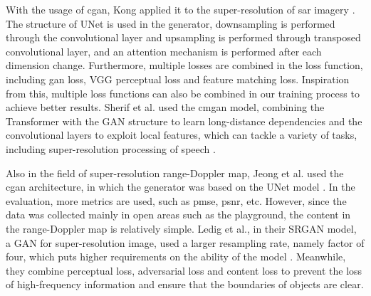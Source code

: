With the usage of \gls{cgan}, Kong applied it to the super-resolution of \gls{sar} imagery \cite{kong_dmsc-gan_2023}. The structure of UNet is used in the generator, downsampling is performed through the convolutional layer and upsampling is performed through transposed convolutional layer, and an attention mechanism is performed after each dimension change. Furthermore, multiple losses are combined in the loss function, including \gls{gan} loss, VGG perceptual loss and feature matching loss. Inspiration from this, multiple loss functions can also be combined in our training process to achieve better results. Sherif et al. used the \gls{cmgan} model, combining the Transformer with the GAN structure to learn long-distance dependencies and the convolutional layers to exploit local features, which can tackle a variety of tasks, including super-resolution processing of speech \cite{abdulatif_cmgan_2024}.

Also in the field of super-resolution range-Doppler map, Jeong et al. used the \gls{cgan} architecture, in which the generator was based on the UNet model \cite{jeong_resource-efficient_2023}. In the evaluation, more metrics are used, such as \gls{pmse}, \gls{psnr}, etc. However, since the data was collected mainly in open areas such as the playground, the content in the range-Doppler map is relatively simple. Ledig et al., in their SRGAN model, a GAN for super-resolution image, used a larger resampling rate, namely factor of four, which puts higher requirements on the ability of the model \cite{ledig_photo-realistic_2017}. Meanwhile, they combine perceptual loss, adversarial loss and content loss to prevent the loss of high-frequency information and ensure that the boundaries of objects are clear.
